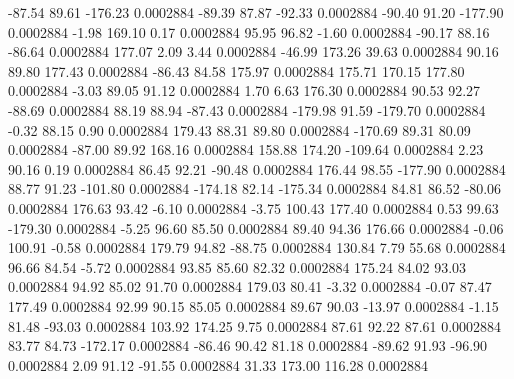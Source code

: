       -87.54       89.61     -176.23     0.0002884
      -89.39       87.87      -92.33     0.0002884
      -90.40       91.20     -177.90     0.0002884
       -1.98      169.10        0.17     0.0002884
       95.95       96.82       -1.60     0.0002884
      -90.17       88.16      -86.64     0.0002884
      177.07        2.09        3.44     0.0002884
      -46.99      173.26       39.63     0.0002884
       90.16       89.80      177.43     0.0002884
      -86.43       84.58      175.97     0.0002884
      175.71      170.15      177.80     0.0002884
       -3.03       89.05       91.12     0.0002884
        1.70        6.63      176.30     0.0002884
       90.53       92.27      -88.69     0.0002884
       88.19       88.94      -87.43     0.0002884
     -179.98       91.59     -179.70     0.0002884
       -0.32       88.15        0.90     0.0002884
      179.43       88.31       89.80     0.0002884
     -170.69       89.31       80.09     0.0002884
      -87.00       89.92      168.16     0.0002884
      158.88      174.20     -109.64     0.0002884
        2.23       90.16        0.19     0.0002884
       86.45       92.21      -90.48     0.0002884
      176.44       98.55     -177.90     0.0002884
       88.77       91.23     -101.80     0.0002884
     -174.18       82.14     -175.34     0.0002884
       84.81       86.52      -80.06     0.0002884
      176.63       93.42       -6.10     0.0002884
       -3.75      100.43      177.40     0.0002884
        0.53       99.63     -179.30     0.0002884
       -5.25       96.60       85.50     0.0002884
       89.40       94.36      176.66     0.0002884
       -0.06      100.91       -0.58     0.0002884
      179.79       94.82      -88.75     0.0002884
      130.84        7.79       55.68     0.0002884
       96.66       84.54       -5.72     0.0002884
       93.85       85.60       82.32     0.0002884
      175.24       84.02       93.03     0.0002884
       94.92       85.02       91.70     0.0002884
      179.03       80.41       -3.32     0.0002884
       -0.07       87.47      177.49     0.0002884
       92.99       90.15       85.05     0.0002884
       89.67       90.03      -13.97     0.0002884
       -1.15       81.48      -93.03     0.0002884
      103.92      174.25        9.75     0.0002884
       87.61       92.22       87.61     0.0002884
       83.77       84.73     -172.17     0.0002884
      -86.46       90.42       81.18     0.0002884
      -89.62       91.93      -96.90     0.0002884
        2.09       91.12      -91.55     0.0002884
       31.33      173.00      116.28     0.0002884
